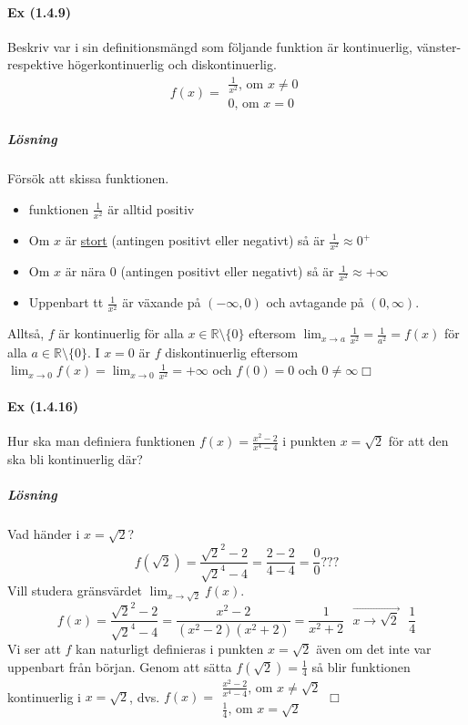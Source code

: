 \paragraph{Ex (1.4.9)} Beskriv var i sin definitionsmängd som följande funktion är kontinuerlig, vänster- respektive högerkontinuerlig och diskontinuerlig.
\begin{equation*}
    f(x)=\begin{matrix}
        \frac{1}{x^2}\text{, om }x\neq 0 \\
        0\text{, om }x=0
    \end{matrix}
\end{equation*}
\subparagraph*{Lösning}
Försök att skissa funktionen.
\begin{itemize}
    \item funktionen $\frac{1}{x^2}$ är alltid positiv
    \item Om $x$ är \underline{stort} (antingen positivt eller negativt) så är $\frac{1}{x^2}\approx 0^+$
    \item Om $x$ är nära $0$ (antingen positivt eller negativt) så är $\frac{1}{x^2}\approx+\infty$
    \item Uppenbart tt $\frac{1}{x^2}$ är växande på $(-\infty,0)$ och avtagande på $(0,\infty)$.
\end{itemize}
Alltså, $f$ är kontinuerlig för alla $x\in\mathbb{R}\setminus \{0\}$ eftersom $\lim_{x\to a}\frac{1}{x^2}=\frac{1}{a^2}=f(x)$ för alla $a\in\mathbb{R}\setminus\{0\}$.
I $x=0$ är $f$ diskontinuerlig eftersom $\lim_{x\to 0}f(x)=\lim_{x\to 0}\frac{1}{x^2}=+\infty$ och $f(0)=0$ och $0\neq\infty\Box$

\paragraph{Ex (1.4.16)} Hur ska man definiera funktionen $f(x)=\frac{x^2-2}{x^4-4}$ i punkten $x=\sqrt{2}$ för att den ska bli kontinuerlig där?
\subparagraph{Lösning} Vad händer i $x=\sqrt{2}$?\\
\begin{equation*}
    f(\sqrt{2})=\frac{\sqrt{2}^2-2}{\sqrt{2}^4-4}=\frac{2-2}{4-4}=\frac{0}{0}\text{???}
\end{equation*}
Vill studera gränsvärdet $\lim_{x\to \sqrt{2}}f(x)$.
\begin{equation*}
    f(x)=\frac{\sqrt{2}^2-2}{\sqrt{2}^4-4}=\frac{x^2-2}{(x^2-2)(x^2+2)}=\frac{1}{x^2+2}\text{ }\overrightarrow{x\to\sqrt{2}}\text{ }\frac{1}{4}
\end{equation*}
Vi ser att $f$ kan naturligt definieras i punkten $x=\sqrt{2}$ även om det inte var uppenbart från början.
Genom att sätta $f(\sqrt{2})=\frac{1}{4}$ så blir funktionen kontinuerlig i $x=\sqrt{2}$, dvs.
$f(x)=
    \begin{matrix}
        \frac{x^2-2}{x^4-4}\text{, om } x\neq\sqrt{2} \\
        \frac{1}{4}\text{, om }x=\sqrt{2}
    \end{matrix}\Box$

